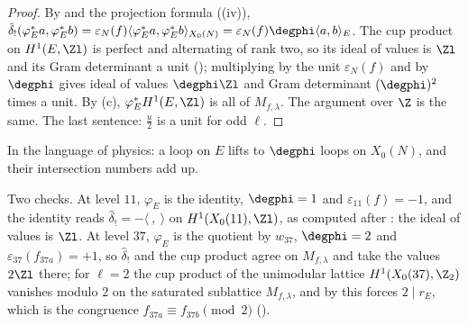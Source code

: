 \begin{proof}
By  and the projection formula ((iv)),
$\hat\delta_!(\varphi_E^*a,\varphi_E^*b)=\varepsilon_N(f)\langle\varphi_E^*a,\varphi_E^*b\rangle_{X_0(N)}=\varepsilon_N(f)\degphi\langle a,b\rangle_E$. The cup product on $H^1(E,\Zl)$ is perfect and alternating of rank two, so its
ideal of values is $\Zl$ and its Gram determinant a unit (); multiplying by the unit $\varepsilon_N(f)$ and by $\degphi$ gives ideal of values $\degphi\Zl$ and Gram determinant
$(\degphi)^2$ times a unit. By (c), $\varphi_E^*H^1(E,\Zl)$ is all of $M_{f,\lambda}$. The argument over $\Z$ is the same. The last sentence: $\frac u2$ is a unit for odd
$\ell$.
\end{proof}

In the language of physics: a loop on $E$ lifts to $\degphi$ loops on $X_0(N)$, and their intersection numbers add up.

Two checks. At level $11$, $\varphi_E$ is the identity, $\degphi=1$ and $\varepsilon_{11}(f)=-1$, and the identity reads $\hat\delta_!=-\langle\ ,\ \rangle$ on $H^1(X_0(11),\Zl)$, as computed after
: the ideal of values is $\Zl$. At level $37$, $\varphi_E$ is the quotient by $w_{37}$, $\degphi=2$ and $\varepsilon_{37}(f_{37a})=+1$, so $\hat\delta_!$ and the cup product
agree on $M_{f,\lambda}$ and take the values $2\Zl$ there; for $\ell=2$ the cup product of the unimodular lattice $H^1(X_0(37),\Z_2)$ vanishes modulo $2$ on the saturated sublattice $M_{f,\lambda}$, and by
 this forces $2\mid r_E$, which is the congruence $f_{37a}\equiv f_{37b}\pmod2$ ().

